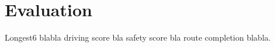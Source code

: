 \section{Evaluation}
\label{sec:evaluation}

Longest6 blabla driving score bla safety score bla route completion blabla.
